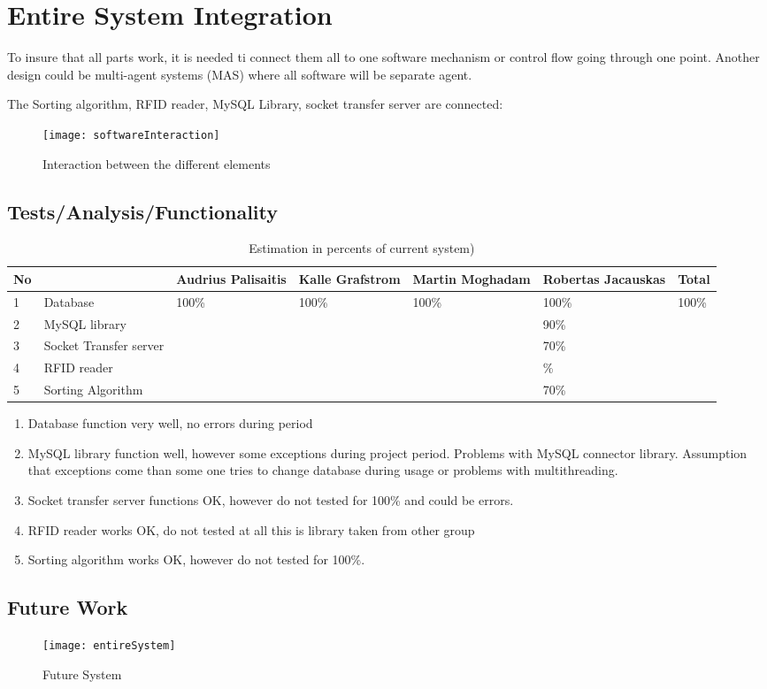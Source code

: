 %
\section{Entire System Integration}

To insure that all parts work, it is needed ti connect them all to one software mechanism or control flow going through one point. Another design could be multi-agent systems (MAS) where all software will be separate agent.

The Sorting algorithm, RFID reader, MySQL Library, socket transfer server are connected:

\begin{figure}[h]
	\centering
		\texttt{[image: softwareInteraction]}
	\caption{Interaction between the different elements}
	\label{fig:softwareInteraction}
\end{figure}


\subsection{Tests/Analysis/Functionality}

\begin{table}[h]
	
    \begin{tabular}{ | p{0.5cm} | p{3.5cm} | p{1.6cm} | p{1.6cm} |p{1.6cm} |p{1.6cm} |p{1cm} |}
    \hline
	No &  & Audrius Palisaitis & Kalle Grafstrom & Martin Moghadam & Robertas Jacauskas & Total\\ \hline
	1 & Database & 100\% & 100\% & 100\% & 100\% & 100\% \\ \hline
	2 & MySQL library &  &  &  & 90\% &  \\ \hline
	3 & Socket Transfer server &  &  &  & 70\% &  \\ \hline
	4 & RFID reader &  &  &  & \% &  \\ \hline
	5 & Sorting Algorithm &  &  &  & 70\% &  \\ \hline
    \end{tabular}
	\caption{Estimation in percents of current system)}
	\label{tab:percentSystem}
\end{table}

\begin{enumerate}
	\item Database function very well, no errors during period
	\item MySQL library function well, however some exceptions during project period. Problems with MySQL connector library. Assumption that exceptions come than some one tries to change database during usage or problems with multithreading.
	\item Socket transfer server functions OK, however do not tested for 100\% and could be errors.
	\item RFID reader works OK, do not tested at all this is library taken from other group
	\item Sorting algorithm works OK, however do not tested for 100\%.
\end{enumerate}

\subsection{Future Work}

\begin{figure}[h]
	\centering
		\texttt{[image: entireSystem]}
	\caption{Future System}
	\label{fig:entireSystem}
\end{figure}